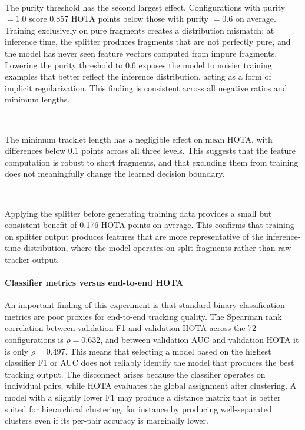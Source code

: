 \

The purity threshold has the second largest effect. Configurations with purity $= 1.0$ score 0.857 HOTA points below those with purity $= 0.6$ on average. Training exclusively on pure fragments creates a distribution mismatch: at inference time, the splitter produces fragments that are not perfectly pure, and the model has never seen feature vectors computed from impure fragments. Lowering the purity threshold to 0.6 exposes the model to noisier training examples that better reflect the inference distribution, acting as a form of implicit regularization. This finding is consistent across all negative ratios and minimum lengths.

\

The minimum tracklet length has a negligible effect on mean HOTA, with differences below 0.1 points across all three levels. This suggests that the feature computation is robust to short fragments, and that excluding them from training does not meaningfully change the learned decision boundary.

\

Applying the splitter before generating training data provides a small but consistent benefit of 0.176 HOTA points on average. This confirms that training on splitter output produces features that are more representative of the inference-time distribution, where the model operates on split fragments rather than raw tracker output.


\paragraph{Classifier metrics versus end-to-end HOTA}
An important finding of this experiment is that standard binary classification metrics are poor proxies for end-to-end tracking quality. The Spearman rank correlation between validation F1 and validation HOTA across the 72 configurations is $\rho = 0.632$, and between validation AUC and validation HOTA it is only $\rho = 0.497$. This means that selecting a model based on the highest classifier F1 or AUC does not reliably identify the model that produces the best tracking output. The disconnect arises because the classifier operates on individual pairs, while HOTA evaluates the global assignment after clustering. A model with a slightly lower F1 may produce a distance matrix that is better suited for hierarchical clustering, for instance by producing well-separated clusters even if its per-pair accuracy is marginally lower.

